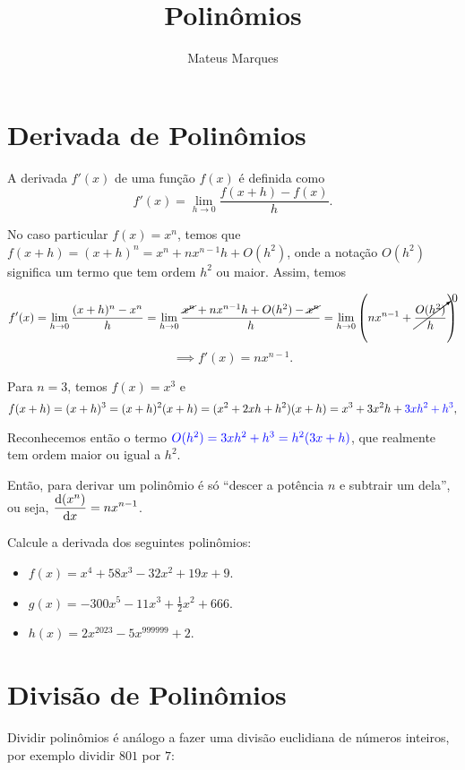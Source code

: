 \documentclass[a4paper,fleqn,12pt]{article}
\title{\Huge{\textbf{Polinômios}}}
\author{Mateus Marques}
\begin{document}
\maketitle

\section{Derivada de Polinômios}

A derivada $f'(x)$ de uma função $f(x)$ é definida como
$$
f'(x) = \lim_{h \to 0} \frac{f(x + h) - f(x)}{h}.
$$

No caso particular $f(x) = x^n$, temos que $f(x + h) = (x + h)^n = x^n + n x^{n-1} h + O(h^2)$, onde a notação $O(h^2)$ significa um termo que tem ordem $h^2$ ou maior. Assim, temos

$$
f'(x) = \lim_{h \to 0} \frac{(x + h)^n - x^n}{h} =
\lim_{h \to 0} \frac{\cancel{x^n} + nx^{n-1} h + O(h^2) - \cancel{x^n}}{h} =
\lim_{h \to 0} \qty( n x^{n-1} + \cancelto{0}{\frac{O(h^2)}{h}} )
$$
$$
\implies f'(x) = n x^{n-1}.
$$

Para $n = 3$, temos $f(x) = x^3$ e
$$
f(x + h) = (x + h)^3 = (x + h)^2 (x + h) = (x^2 + 2xh + h^2) (x + h) = x^3 + 3 x^2 h + \textcolor{blue}{3 x h^2 + h^3},
$$

Reconhecemos então o termo $\textcolor{blue}{O(h^2) = 3x h^2 + h^3 = h^2 ( 3x + h )}$, que realmente tem ordem maior ou igual a $h^2$.

Então, para derivar um polinômio é só ``descer a potência $n$ e subtrair um dela'', ou seja, $\displaystyle{\dv{(x^n)}{x} = n x^{n-1}}$.

\n\n

Calcule a derivada dos seguintes polinômios:
\begin{itemize}
\item $f(x) = x^4 + 58 x^3 - 32 x^2 + 19 x + 9$.
\item $g(x) = - 300 x^5 - 11 x^3 + \frac{1}{2} x^2 + 666$.
\item $h(x) = 2 x^{2023} - 5 x^{999999} + 2$.
\end{itemize}

\pagebreak

\section{Divisão de Polinômios}

Dividir polinômios é análogo a fazer uma divisão euclidiana de números inteiros, por exemplo dividir $801$ por $7$:
\end{document}
